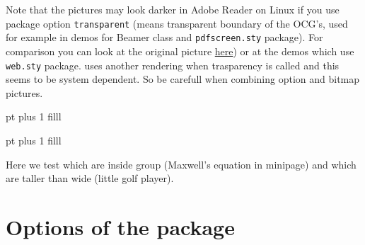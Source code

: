 \beamernewpage Note that the pictures may look darker in Adobe Reader
on Linux if you use package option \texttt{transparent} (means
transparent boundary of the OCG's, used for example in demos for
Beamer class and \verb|pdfscreen.sty| package). For comparison you can
look at the original picture
\href{http://math.mendelu.cz/en/analyza?lang=en}{here}) or at the
demos which use \verb|web.sty| package.  uses another
rendering when trasparency is called and this seems to be system
dependent. So be carefull when combining
  option and
bitmap pictures.

\begin{minipage}[c]{0.4\linewidth}
\end{minipage} pt plus 1 filll
\begin{minipage}[c]{0.2\linewidth}
\end{minipage} pt plus 1 filll
\begin{minipage}{0.3\linewidth}
  Here we test
   which are inside group
  (Maxwell's equation in minipage) and which are taller than wide
  (little golf player).
\end{minipage}

\newpage
\section{Options of the package}


